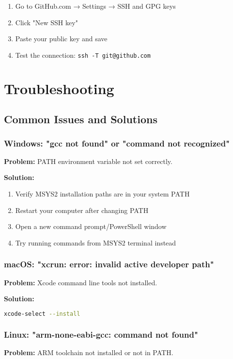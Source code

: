 \documentclass[11pt,a4paper]{article}
\begin{document}
\begin{enumerate}
    \item Go to GitHub.com → Settings → SSH and GPG keys
    \item Click "New SSH key"
    \item Paste your public key and save
    \item Test the connection: \texttt{ssh -T git@github.com}
\end{enumerate}

\section{Troubleshooting}

\subsection{Common Issues and Solutions}

\subsubsection{Windows: "gcc not found" or "command not recognized"}
\textbf{Problem:} PATH environment variable not set correctly.

\textbf{Solution:}
\begin{enumerate}
    \item Verify MSYS2 installation paths are in your system PATH
    \item Restart your computer after changing PATH
    \item Open a new command prompt/PowerShell window
    \item Try running commands from MSYS2 terminal instead
\end{enumerate}

\subsubsection{macOS: "xcrun: error: invalid active developer path"}
\textbf{Problem:} Xcode command line tools not installed.

\textbf{Solution:}
\begin{lstlisting}[language=bash]
xcode-select --install
\end{lstlisting}

\subsubsection{Linux: "arm-none-eabi-gcc: command not found"}
\textbf{Problem:} ARM toolchain not installed or not in PATH.
\end{document}
